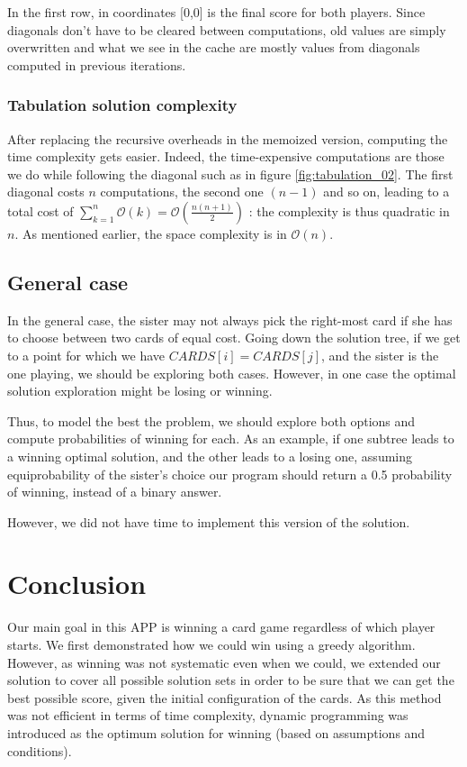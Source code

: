 \documentclass[a4paper,12pt,fleqn]{article}
\newcommand\ezskip{\medskip\noindent}
\begin{document}
In the first row, in coordinates [0,0] is the final score for both players. Since diagonals don't have to be cleared between computations, old values are simply overwritten and what we see in the cache are mostly values from diagonals computed in previous iterations.

\subsubsection{Tabulation solution complexity}

After replacing the recursive overheads in the memoized version, computing the time complexity gets easier. Indeed, the time-expensive computations are those we do while following the diagonal such as in figure \ref{fig:tabulation_02}. The first diagonal costs $n$ computations, the second one $(n - 1)$ and so on, leading to a total cost of $\sum_{k = 1}^{n} \mathcal{O}(k) = \mathcal{O}(\frac{n(n+1)}{2})$ : the complexity is thus quadratic in $n$.
\ezskip As mentioned earlier, the space complexity is in $\mathcal{O}(n)$.

\subsection{General case}

In the general case, the sister may not always pick the right-most card if she has to choose between two cards of equal cost.
Going down the solution tree, if we get to a point for which we have $CARDS[i] = CARDS[j]$, and the sister is the one playing, we should be exploring both cases. However, in one case the optimal solution exploration might be losing or winning.

\ezskip Thus, to model the best the problem, we should explore both options and compute probabilities of winning for each. As an example, if one subtree leads to a winning optimal solution, and the other leads to a losing one, assuming equiprobability of the sister's choice our program should return a 0.5 probability of winning, instead of a binary answer.

\ezskip
However, we did not have time to implement this version of the solution.


\newpage
\section{Conclusion}
Our main goal in this APP is winning a card game regardless of which player starts. We first demonstrated how we could win using a greedy algorithm. However, as winning was not systematic even when we could, we extended our solution to cover all possible solution sets in order to be sure that we can get the best possible score, given the initial configuration of the cards. As this method was not efficient in terms of time complexity, dynamic programming was introduced as the optimum solution for winning (based on assumptions and conditions).
\end{document}
